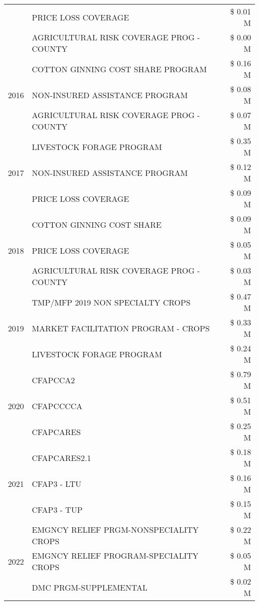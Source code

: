 \begin{tabular}{llr}
 & PRICE LOSS COVERAGE & \$ 0.01 M \\
 & AGRICULTURAL RISK COVERAGE PROG - COUNTY & \$ 0.00 M \\
\cline{1-3}
\multirow[t]{3}{*}{2016} & COTTON GINNING COST SHARE PROGRAM & \$ 0.16 M \\
 & NON-INSURED ASSISTANCE PROGRAM & \$ 0.08 M \\
 & AGRICULTURAL RISK COVERAGE PROG - COUNTY & \$ 0.07 M \\
\cline{1-3}
\multirow[t]{3}{*}{2017} & LIVESTOCK FORAGE PROGRAM & \$ 0.35 M \\
 & NON-INSURED ASSISTANCE PROGRAM & \$ 0.12 M \\
 & PRICE LOSS COVERAGE & \$ 0.09 M \\
\cline{1-3}
\multirow[t]{3}{*}{2018} & COTTON GINNING COST SHARE & \$ 0.09 M \\
 & PRICE LOSS COVERAGE & \$ 0.05 M \\
 & AGRICULTURAL RISK COVERAGE PROG - COUNTY & \$ 0.03 M \\
\cline{1-3}
\multirow[t]{3}{*}{2019} & TMP/MFP 2019 NON SPECIALTY CROPS & \$ 0.47 M \\
 & MARKET FACILITATION PROGRAM - CROPS & \$ 0.33 M \\
 & LIVESTOCK FORAGE PROGRAM & \$ 0.24 M \\
\cline{1-3}
\multirow[t]{3}{*}{2020} & CFAPCCA2 & \$ 0.79 M \\
 & CFAPCCCCA & \$ 0.51 M \\
 & CFAPCARES & \$ 0.25 M \\
\cline{1-3}
\multirow[t]{3}{*}{2021} & CFAPCARES2.1 & \$ 0.18 M \\
 & CFAP3 - LTU & \$ 0.16 M \\
 & CFAP3 - TUP & \$ 0.15 M \\
\cline{1-3}
\multirow[t]{3}{*}{2022} & EMGNCY RELIEF PRGM-NONSPECIALITY CROPS & \$ 0.22 M \\
 & EMGNCY RELIEF PROGRAM-SPECIALITY CROPS & \$ 0.05 M \\
 & DMC PRGM-SUPPLEMENTAL & \$ 0.02 M \\
\cline{1-3}
\bottomrule
\end{tabular}
